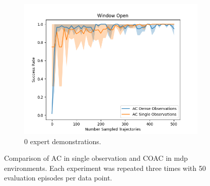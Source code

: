 \begin{figure}[htbp]
\begin{subfigure}[t]{0.32\textwidth}
    \includegraphics[width=\textwidth]{images/dense_vs_sparse_0/Window Open.png}
    \caption{0 expert demonstrations.}
  \end{subfigure}
  \caption{Comparison of AC in single observation and COAC in mdp environments. Each experiment was repeated three times with 50 evaluation episodes per data point.
  }
  \label{fig:dense_vs_single}
\end{figure}